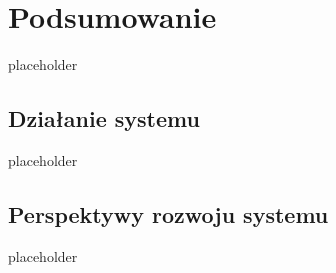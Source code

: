 \chapter{Podsumowanie}

placeholder

\section{Działanie systemu}

placeholder

\section{Perspektywy rozwoju systemu}

placeholder